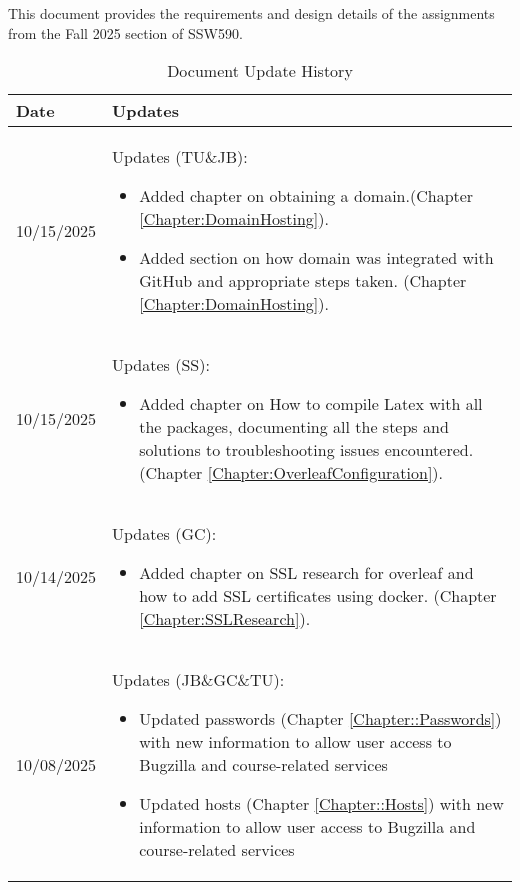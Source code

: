 This document provides the requirements and design details of the
assignments from the Fall 2025 section of SSW590.


\begin{longtable}{|l||p{13.5cm}|}
\caption{Document Update History \label{Table::UpdateHistory}}\\
\hline
\textbf{Date} & \textbf{Updates} \\
\hline 
\endhead

10/15/2025 & Updates (TU\&JB):
\begin{itemize}[topsep=0pt,itemsep=0pt,parsep=0pt,partopsep=0pt,leftmargin=12pt]
\item Added chapter on obtaining a domain.(Chapter \ref{Chapter:DomainHosting}). 
\item Added section on how domain was integrated with GitHub and appropriate steps taken. (Chapter \ref{Chapter:DomainHosting}).
\end{itemize} 
\\ \hline

10/15/2025 & Updates (SS):
\begin{itemize}[topsep=0pt,itemsep=0pt,parsep=0pt,partopsep=0pt,leftmargin=12pt]
\item Added chapter on How to compile Latex with all the packages, documenting all the steps and solutions to troubleshooting issues encountered.(Chapter \ref{Chapter:OverleafConfiguration}). 
\end{itemize} 
\\ \hline

10/14/2025 & Updates (GC):
\begin{itemize}[topsep=0pt,itemsep=0pt,parsep=0pt,partopsep=0pt,leftmargin=12pt]
\item Added chapter on SSL research for overleaf and how to add SSL certificates using docker. (Chapter \ref{Chapter:SSLResearch}). 
\end{itemize} 
\\ \hline

10/08/2025 & Updates (JB\&GC\&TU):
\begin{itemize}[topsep=0pt,itemsep=0pt,parsep=0pt,partopsep=0pt,leftmargin=12pt]
\item Updated passwords (Chapter \ref{Chapter::Passwords}) with new information to allow user access to Bugzilla and course-related services 
\item Updated hosts (Chapter \ref{Chapter::Hosts}) with new information to allow user access to Bugzilla and course-related services 
\end{itemize} 
\\ \hline


\end{longtable}
